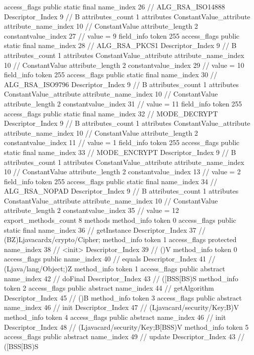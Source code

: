 {{{{{				access_flags	public static final
				name_index	26		// ALG_RSA_ISO14888
				Descriptor_Index	9		// B
				attributes_count	1
				attributes {
				ConstantValue_attribute {
					attribute_name_index	10		// ConstantValue
					attribute_length	2
					constantvalue_index	27		// value = 9
				}
				}
			}
			field_info {
				token	255
				access_flags	public static final
				name_index	28		// ALG_RSA_PKCS1
				Descriptor_Index	9		// B
				attributes_count	1
				attributes {
				ConstantValue_attribute {
					attribute_name_index	10		// ConstantValue
					attribute_length	2
					constantvalue_index	29		// value = 10
				}
				}
			}
			field_info {
				token	255
				access_flags	public static final
				name_index	30		// ALG_RSA_ISO9796
				Descriptor_Index	9		// B
				attributes_count	1
				attributes {
				ConstantValue_attribute {
					attribute_name_index	10		// ConstantValue
					attribute_length	2
					constantvalue_index	31		// value = 11
				}
				}
			}
			field_info {
				token	255
				access_flags	public static final
				name_index	32		// MODE_DECRYPT
				Descriptor_Index	9		// B
				attributes_count	1
				attributes {
				ConstantValue_attribute {
					attribute_name_index	10		// ConstantValue
					attribute_length	2
					constantvalue_index	11		// value = 1
				}
				}
			}
			field_info {
				token	255
				access_flags	public static final
				name_index	33		// MODE_ENCRYPT
				Descriptor_Index	9		// B
				attributes_count	1
				attributes {
				ConstantValue_attribute {
					attribute_name_index	10		// ConstantValue
					attribute_length	2
					constantvalue_index	13		// value = 2
				}
				}
			}
			field_info {
				token	255
				access_flags	public static final
				name_index	34		// ALG_RSA_NOPAD
				Descriptor_Index	9		// B
				attributes_count	1
				attributes {
				ConstantValue_attribute {
					attribute_name_index	10		// ConstantValue
					attribute_length	2
					constantvalue_index	35		// value = 12
				}
				}
			}
			}
			export_methods_count	8
			methods {
				method_info {
					token	0
					access_flags	public static final
					name_index	36		// getInstance
					Descriptor_Index	37		// (BZ)Ljavacardx/crypto/Cipher;
				}
				method_info {
					token	1
					access_flags	protected
					name_index	38		// <init>
					Descriptor_Index	39		// ()V
				}
				method_info {
					token	0
					access_flags	public
					name_index	40		// equals
					Descriptor_Index	41		// (Ljava/lang/Object;)Z
				}
				method_info {
					token	1
					access_flags	public abstract
					name_index	42		// doFinal
					Descriptor_Index	43		// ([BSS[BS)S
				}
				method_info {
					token	2
					access_flags	public abstract
					name_index	44		// getAlgorithm
					Descriptor_Index	45		// ()B
				}
				method_info {
					token	3
					access_flags	public abstract
					name_index	46		// init
					Descriptor_Index	47		// (Ljavacard/security/Key;B)V
				}
				method_info {
					token	4
					access_flags	public abstract
					name_index	46		// init
					Descriptor_Index	48		// (Ljavacard/security/Key;B[BSS)V
				}
				method_info {
					token	5
					access_flags	public abstract
					name_index	49		// update
					Descriptor_Index	43		// ([BSS[BS)S
				}
			}
		}
	}
}
